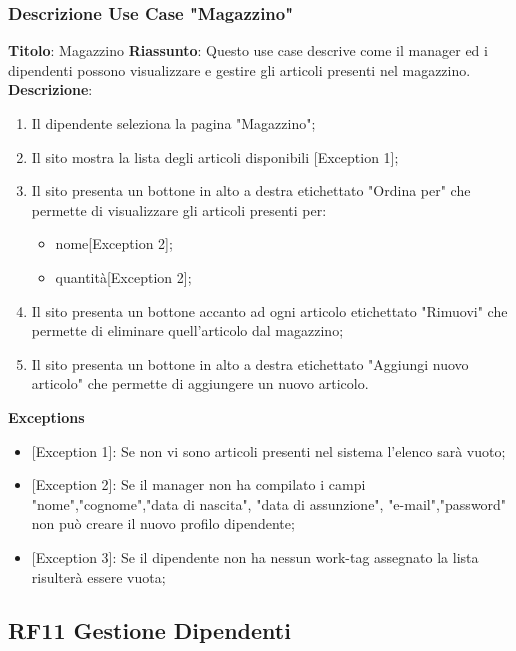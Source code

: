 \documentclass{report}
\begin{document}
\subsubsection*{Descrizione Use Case "Magazzino"}
\textbf{Titolo}: Magazzino \newline
\textbf{Riassunto}: Questo use case descrive come il manager ed i dipendenti possono visualizzare e gestire gli articoli presenti nel magazzino. \newline
\textbf{Descrizione}:
\begin{enumerate}
	\item Il dipendente seleziona la pagina "Magazzino";
	\item Il sito mostra la lista degli articoli disponibili [Exception 1];
	\item Il sito presenta un bottone in alto a destra etichettato "Ordina per" che permette di visualizzare gli articoli presenti per:
	\begin{itemize}
		\item nome[Exception 2];
		\item quantità[Exception 2];
	\end{itemize}
	\item Il sito presenta un bottone accanto ad ogni articolo etichettato "Rimuovi" che permette di eliminare quell'articolo dal magazzino;
	\item Il sito presenta un bottone in alto a destra etichettato "Aggiungi nuovo articolo" che permette di aggiungere un nuovo articolo.
	
\end{enumerate}
\textbf{Exceptions}
\begin{itemize}
	\item {[Exception 1]}: Se non vi sono articoli presenti nel sistema l'elenco sarà vuoto;
	\item {[Exception 2]}: Se il manager non ha compilato i campi "nome","cognome","data di nascita", "data di assunzione", "e-mail","password" non può creare il nuovo profilo dipendente;
	\item {[Exception 3]}: Se il dipendente non ha nessun work-tag assegnato la lista risulterà essere vuota;
\end{itemize}

\subsection*{RF11 Gestione Dipendenti}
\end{document}
